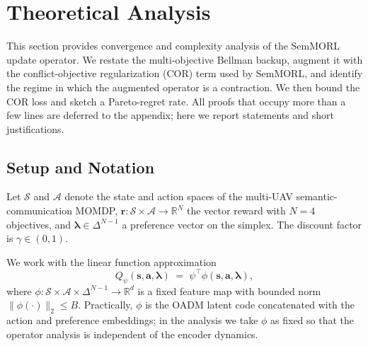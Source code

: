 %
%
%

\section{Theoretical Analysis}
\label{sec:theory}

This section provides convergence and complexity analysis of the SemMORL
update operator. We restate the multi-objective Bellman backup, augment it
with the conflict-objective regularization (COR) term used by SemMORL, and
identify the regime in which the augmented operator is a contraction.
We then bound the COR loss and sketch a Pareto-regret rate. All proofs
that occupy more than a few lines are deferred to the appendix; here we
report statements and short justifications.

\subsection{Setup and Notation}
\label{ssec:theory_setup}

Let $\mathcal{S}$ and $\mathcal{A}$ denote the state and action spaces of
the multi-UAV semantic-communication MOMDP, $\mathbf{r}: \mathcal{S}\times
\mathcal{A}\to\mathbb{R}^N$ the vector reward with $N=4$ objectives, and
$\bm{\lambda}\in\Delta^{N-1}$ a preference vector on the simplex. The
discount factor is $\gamma\in(0,1)$.

We work with the linear function approximation
\begin{equation}
\label{eq:linfa}
Q_\psi(\mathbf{s},\mathbf{a},\bm{\lambda}) \;=\; \psi^\top
\phi(\mathbf{s},\mathbf{a},\bm{\lambda}),
\end{equation}
where $\phi:\mathcal{S}\times\mathcal{A}\times\Delta^{N-1}\to\mathbb{R}^d$
is a fixed feature map with bounded norm $\|\phi(\cdot)\|_2\le B$.
Practically, $\phi$ is the OADM latent code concatenated with the action
and preference embeddings; in the analysis we take $\phi$ as fixed so
that the operator analysis is independent of the encoder dynamics.

